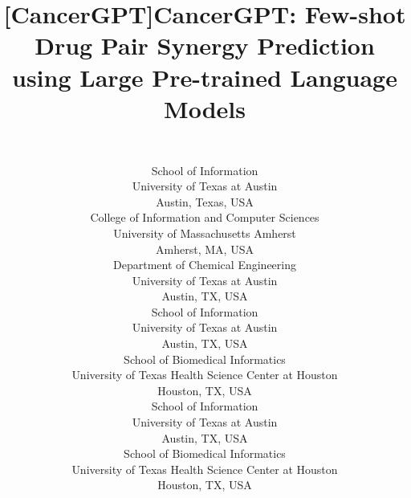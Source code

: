 \title{[CancerGPT]{CancerGPT: Few-shot Drug Pair Synergy Prediction using Large Pre-trained Language Models}

\author{
       \\ 
       \addr School of Information\\
       University of Texas at Austin\\
       Austin, Texas, USA
       \AND
       \\ 
       \addr College of Information and Computer Sciences\\
       University of Massachusetts Amherst\\
       Amherst, MA, USA
       \AND
       \\ 
       \addr Department of Chemical Engineering\\
       University of Texas at Austin\\
       Austin, TX, USA 
       \AND
       \\ 
       \addr School of Information\\
       University of Texas at Austin\\
       Austin, TX, USA
       \AND
       \\ 
       \addr School of Biomedical Informatics\\
       University of Texas Health Science Center at Houston\\
       Houston, TX, USA
       \AND
       \\ 
       \addr School of Information\\
       University of Texas at Austin\\
       Austin, TX, USA
       \AND
       \\ 
       \addr School of Biomedical Informatics\\
       University of Texas Health Science Center at Houston\\
       Houston, TX, USA} 


\usepackage{lineno}



\maketitle



}
